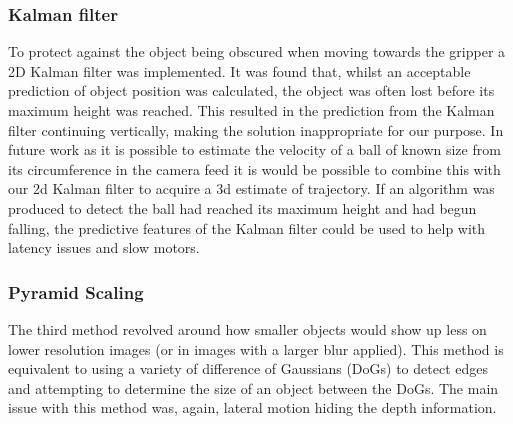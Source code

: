 \documentclass[conference]{IEEEtran}
\begin{document}
\subsubsection{Kalman filter}
To protect against the object being obscured when moving towards the gripper a 2D Kalman filter was implemented. It was found that, whilst an acceptable prediction of object position was calculated, the object was often lost before its maximum height was reached. This resulted in the prediction from the Kalman filter continuing vertically, making the solution inappropriate for our purpose. In future work as it is possible to estimate the velocity of a ball of known size from its circumference in the camera feed it is would be possible to combine this with our 2d Kalman filter to acquire a 3d estimate of trajectory. If an algorithm was produced to detect the ball had reached its maximum height and had begun falling, the predictive features of the Kalman filter could be used to help with latency issues and slow motors.

\subsubsection{Pyramid Scaling}
The third method revolved around how smaller objects would show up less on lower resolution images (or in images with a larger blur applied). This method is equivalent to using a variety of difference of Gaussians (DoGs) to detect edges and attempting to determine the size of an object between the DoGs. The main issue with this method was, again, lateral motion hiding the depth information.
\end{document}

